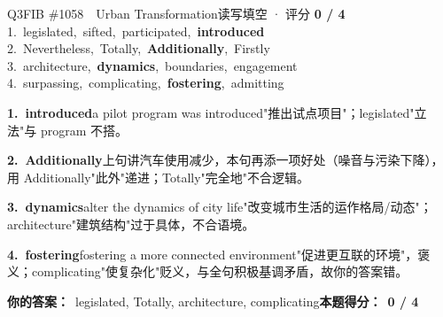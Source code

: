 \begin{qblock}{Q3\quad FIB \#1058\ \ Urban Transformation}{读写填空 · 评分 \textcolor{cAccent}{\bfseries 0 / 4}}
{\small
1.\ legislated,\ sifted,\ participated,\ \textbf{introduced}\\
2.\ Nevertheless,\ Totally,\ \textbf{Additionally},\ Firstly\\
3.\ architecture,\ \textbf{dynamics},\ boundaries,\ engagement\\
4.\ surpassing,\ complicating,\ \textbf{fostering},\ admitting}
\begin{notebox}\footnotesize
\textbf{1.\ introduced}\quad a pilot program was introduced"推出试点项目"；legislated"立法"与 program 不搭。\par\smallskip
\textbf{2.\ Additionally}\quad 上句讲汽车使用减少，本句再添一项好处（噪音与污染下降），用 Additionally"此外"递进；Totally"完全地"不合逻辑。\par\smallskip
\textbf{3.\ dynamics}\quad alter the dynamics of city life"改变城市生活的运作格局/动态"；architecture"建筑结构"过于具体，不合语境。\par\smallskip
\textbf{4.\ fostering}\quad fostering a more connected environment"促进更互联的环境"，褒义；complicating"使复杂化"贬义，与全句积极基调矛盾，故你的答案错。
\end{notebox}
\smallskip
\textbf{你的答案：}\ {\color{cWrong}legislated, Totally, architecture, complicating}\qquad\textbf{本题得分：}\ {\color{cAccent}\bfseries 0 / 4}
\end{qblock}

